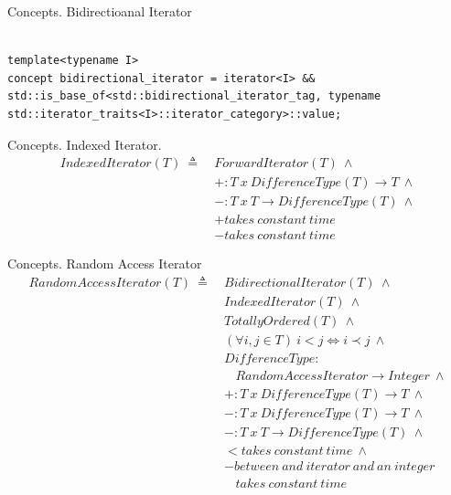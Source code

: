 \documentclass[10pt]{beamer}
\begin{document}
\begin{frame}[fragile]{Concepts. Bidirectioanal Iterator}
\begin{lstlisting}[style=cpp]

template<typename I>
concept bidirectional_iterator = iterator<I> && std::is_base_of<std::bidirectional_iterator_tag, typename std::iterator_traits<I>::iterator_category>::value;

\end{lstlisting}
\end{frame}


\begin{frame}{Concepts. Indexed Iterator.}
    \begin{align*}
        IndexedIterator(T) ~\triangleq~ & ForwardIterator(T) ~\land \\
                                              & +: T~x~DifferenceType(T) \rightarrow T ~\land\\
                                              & -: T~x~T \rightarrow DifferenceType(T) ~\land\\
                                              & + takes~constant~time\\
                                              & - takes~constant~time
    \end{align*}
\end{frame}



\begin{frame}{Concepts. Random Access Iterator}
    \begin{align*}
        RandomAccessIterator(T)  ~\triangleq~ & BidirectionalIterator(T) ~\land \\
                                              & IndexedIterator(T) ~\land \\
                                              & TotallyOrdered(T) ~\land \\
                                              & (\forall i,j \in T) ~i < j \iff i \prec j ~ \land \\
                                              & DifferenceType: \\
                                              & ~~~~RandomAccessIterator \rightarrow Integer ~ \land\\
                                              & +: T~x~DifferenceType(T) \rightarrow T ~\land\\
                                              & -: T~x~DifferenceType(T) \rightarrow T ~\land\\
                                              & -: T~x~T \rightarrow DifferenceType(T) ~\land\\
                                              & < takes~constant~time ~\land\\
                                              & - between~and~iterator~and~an~integer \\
                                              & ~~~~takes~constant~time
    \end{align*}
\end{frame}
\end{document}
